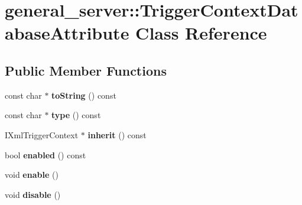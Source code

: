 \hypertarget{classgeneral__server_1_1TriggerContextDatabaseAttribute}{\section{general\-\_\-server\-:\-:\-Trigger\-Context\-Database\-Attribute \-Class \-Reference}
\label{classgeneral__server_1_1TriggerContextDatabaseAttribute}
}
\subsection*{\-Public \-Member \-Functions}
\begin{DoxyCompactItemize}
\item 
\hypertarget{classgeneral__server_1_1TriggerContextDatabaseAttribute_a8de6d2298867e95cf6b2fc08da179bfa}{const char $\ast$ {\bfseries to\-String} () const }\label{classgeneral__server_1_1TriggerContextDatabaseAttribute_a8de6d2298867e95cf6b2fc08da179bfa}

\item 
\hypertarget{classgeneral__server_1_1TriggerContextDatabaseAttribute_a0bf13ccd8f8a82a1728393c9fdfaea59}{const char $\ast$ {\bfseries type} () const }\label{classgeneral__server_1_1TriggerContextDatabaseAttribute_a0bf13ccd8f8a82a1728393c9fdfaea59}

\item 
\hypertarget{classgeneral__server_1_1TriggerContextDatabaseAttribute_a56981f2635e76e5759dfb41d48041a14}{\-I\-Xml\-Trigger\-Context $\ast$ {\bfseries inherit} () const }\label{classgeneral__server_1_1TriggerContextDatabaseAttribute_a56981f2635e76e5759dfb41d48041a14}

\item 
\hypertarget{classgeneral__server_1_1TriggerContextDatabaseAttribute_a050e526a07411bc3739ce6a0ea44b38d}{bool {\bfseries enabled} () const }\label{classgeneral__server_1_1TriggerContextDatabaseAttribute_a050e526a07411bc3739ce6a0ea44b38d}

\item 
\hypertarget{classgeneral__server_1_1TriggerContextDatabaseAttribute_ae0acbf997c381a5e3fe47899762d8a55}{void {\bfseries enable} ()}\label{classgeneral__server_1_1TriggerContextDatabaseAttribute_ae0acbf997c381a5e3fe47899762d8a55}

\item 
\hypertarget{classgeneral__server_1_1TriggerContextDatabaseAttribute_a758c89440c98f2cc5512a7ae1e6c9c53}{void {\bfseries disable} ()}\label{classgeneral__server_1_1TriggerContextDatabaseAttribute_a758c89440c98f2cc5512a7ae1e6c9c53}


\end{DoxyCompactItemize}

